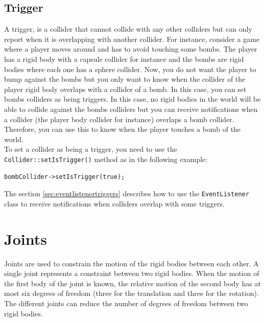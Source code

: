 \documentclass[a4paper,12pt]{article}
\begin{document}
    \subsection{Trigger}
    \label{sec:trigger}

    A trigger, is a collider that cannot collide with any other colliders but can only report when it is overlapping with another collider. For instance,
    consider a game where a player moves around and has to avoid touching some bombs. The player has a rigid body with a capsule collider for instance and
    the bombs are rigid bodies where each one has a sphere collider. Now, you do not want the player to bump against the bombs but you only want to know
    when the collider of the player rigid body overlaps with a collider of a bomb. In this case, you can set bombs colliders as being triggers. In this
    case, no rigid bodies in the world will be able to collide against the bombs colliders but you can receive notifications when a collider (the player
    body collider for instance) overlaps a bomb collider. Therefore, you can use this to know when the player touches a bomb of the world. \\
    
    To set a collider as being a trigger, you need to use the \texttt{Collider::setIsTrigger()} method as in the following example: \\

    \begin{lstlisting}
bombCollider->setIsTrigger(true);
   \end{lstlisting}

  
   \vspace{0.6cm}

   The section \ref{sec:eventlistenertriggers} describes how to use the \texttt{EventListener} class to receive notifications when colliders overlap
   with some triggers.
    
    \section{Joints}

    Joints are used to constrain the motion of the rigid bodies between each other. A single joint represents a constraint between two rigid bodies.
    When the motion of the first body of the joint is known, the relative motion of the second body has at most six degrees of freedom (three for the
    translation and three for the rotation). The different joints can reduce the number of degrees of freedom between two rigid bodies. \\
\end{document}
